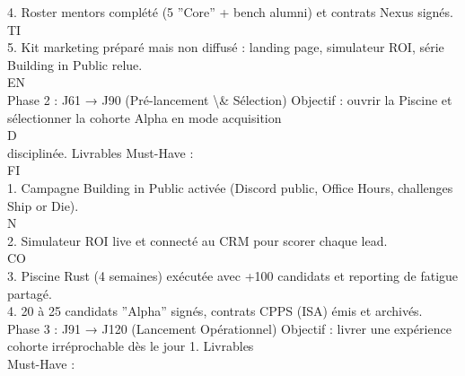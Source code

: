 \documentclass[12pt,landscape,a4paper]{article}
\begin{document}
4. Roster mentors complété (5 ”Core” + bench alumni) et contrats Nexus signés.\\
\vspace{0.5em}
\vspace{0.5em}
\vspace{0.5em}
\vspace{0.5em}
TI\\
5. Kit marketing préparé mais non diffusé : landing page, simulateur ROI, série Building in Public relue.\\
\vspace{0.5em}
\vspace{0.5em}
\vspace{0.5em}
\vspace{0.5em}
EN\\
Phase 2 : J61 → J90 (Pré-lancement \textbackslash{}& Sélection) Objectif : ouvrir la Piscine et sélectionner la cohorte Alpha en mode acquisition\\
\vspace{0.5em}
\vspace{0.5em}
\vspace{0.5em}
\vspace{0.5em}
D\\
disciplinée. Livrables Must-Have :\\
\vspace{0.5em}
\vspace{0.5em}
\vspace{0.5em}
\vspace{0.5em}
FI\\
1. Campagne Building in Public activée (Discord public, Office Hours, challenges Ship or Die).\\
\vspace{0.5em}
N\\
2. Simulateur ROI live et connecté au CRM pour scorer chaque lead.\\
CO\\
3. Piscine Rust (4 semaines) exécutée avec +100 candidats et reporting de fatigue partagé.\\
\vspace{0.5em}
4. 20 à 25 candidats ”Alpha” signés, contrats CPPS (ISA) émis et archivés.\\
\vspace{0.5em}
Phase 3 : J91 → J120 (Lancement Opérationnel)            Objectif : livrer une expérience cohorte irréprochable dès le jour 1. Livrables\\
Must-Have :\\
\vspace{0.5em}
\end{document}
